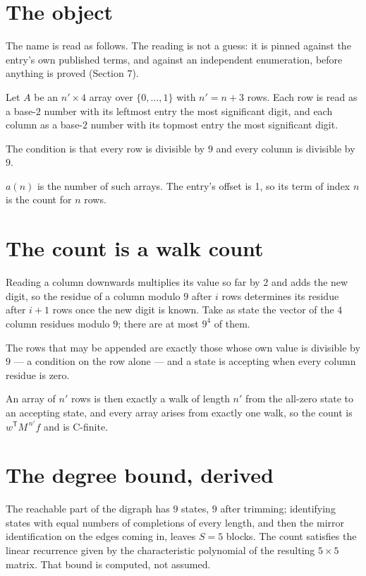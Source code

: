 \documentclass[11pt]{article}
\theoremstyle{definition}
\begin{document}
\section{The object}

The name is read as follows. The reading is not a guess: it is pinned against the entry's own published terms, and against an independent enumeration, before anything is proved (Section 7).

Let $A$ be an $n' \times 4$ array over $\{0,\dots,1\}$ with $n' = n + 3$ rows. Each row is read as a base-$2$ number with its leftmost entry the most significant digit, and each column as a base-$2$ number with its topmost entry the most significant digit.

The condition is that every row is divisible by $9$ and every column is divisible by $9$.

$a(n)$ is the number of such arrays. The entry's offset is 1, so its term of index $n$ is the count for $n$ rows.

\section{The count is a walk count}

Reading a column downwards multiplies its value so far by $2$ and adds the new digit, so the residue of a column modulo $9$ after $i$ rows determines its residue after $i+1$ rows once the new digit is known. Take as state the vector of the $4$ column residues modulo $9$; there are at most $9^{4}$ of them.

The rows that may be appended are exactly those whose own value is divisible by $9$ --- a condition on the row alone --- and a state is accepting when every column residue is zero.

An array of $n'$ rows is then exactly a walk of length $n'$ from the all-zero state to an accepting state, and every array arises from exactly one walk, so the count is $w^{\mathsf T}M^{\,n'}f$ and is C-finite.

\section{The degree bound, derived}

The reachable part of the digraph has $9$ states, $9$ after trimming; identifying states with equal numbers of completions of every length, and then the mirror identification on the edges coming in, leaves $S = 5$ blocks. The count satisfies the linear recurrence given by the characteristic polynomial of the resulting $5\times5$ matrix. That bound is computed, not assumed.
\end{document}
